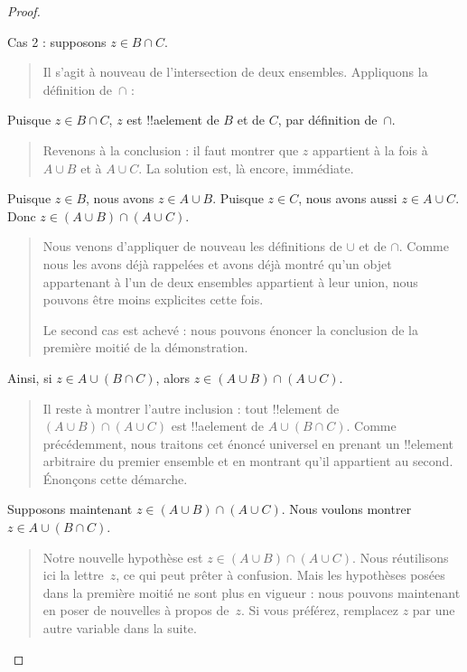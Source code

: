 \documentclass[../../../include/open-logic-section]{subfiles}
\begin{document}
\begin{proof}
\begin{quote}
\end{quote}
Cas 2 : supposons $z \in B \cap C$.
\begin{quote}
Il s'agit à nouveau de l'intersection
de deux ensembles. Appliquons la
définition de~$\cap$ :
\end{quote}
Puisque $z \in B \cap C$, $z$ est
!!a{element} de $B$ et de $C$,
par définition de~$\cap$.
\begin{quote}
Revenons à la conclusion : il faut
montrer que $z$ appartient à la
fois à $A \cup B$ et à $A \cup C$.
La solution est, là encore, immédiate.
\end{quote}
Puisque $z \in B$, nous avons
$z \in A \cup B$. Puisque
$z \in C$, nous avons aussi
$z \in A \cup C$. Donc
$z \in (A \cup B) \cap (A \cup C)$.
\begin{quote}
Nous venons d'appliquer de nouveau
les définitions de $\cup$ et de $\cap$.
Comme nous les avons déjà rappelées
et avons déjà montré qu'un objet
appartenant à l'un de deux ensembles
appartient à leur union, nous pouvons
être moins explicites cette fois.

Le second cas est achevé : nous pouvons
énoncer la conclusion de la première
moitié de la démonstration.
\end{quote}
Ainsi, si $z \in A \cup (B \cap C)$,
alors $z \in (A \cup B) \cap (A \cup C)$.
\begin{quote}
Il reste à montrer l'autre inclusion :
tout !!{element} de
$(A \cup B) \cap (A \cup C)$ est
!!a{element} de $A \cup (B \cap C)$.
Comme précédemment, nous traitons cet
énoncé universel en prenant un
!!{element} arbitraire du premier
ensemble et en montrant qu'il appartient
au second. Énonçons cette démarche.
\end{quote}
Supposons maintenant
$z \in (A \cup B) \cap (A \cup C)$.
Nous voulons montrer
$z \in A \cup (B \cap C)$.
\begin{quote}
Notre nouvelle hypothèse est
$z \in (A \cup B) \cap (A \cup C)$.
Nous réutilisons ici la lettre~$z$,
ce qui peut prêter à confusion.
Mais les hypothèses posées dans
la première moitié ne sont plus
en vigueur : nous pouvons maintenant
en poser de nouvelles à propos de~$z$.
Si vous préférez, remplacez $z$ par
une autre variable dans la suite.


\end{quote}
\end{proof}
\end{document}
